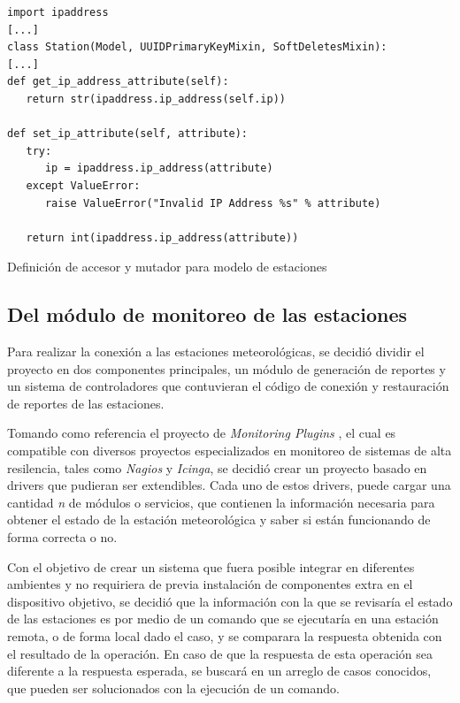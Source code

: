 
\begin{listing}
\begin{verbatim}
import ipaddress
[...]
class Station(Model, UUIDPrimaryKeyMixin, SoftDeletesMixin):
[...]
def get_ip_address_attribute(self):
   return str(ipaddress.ip_address(self.ip))

def set_ip_attribute(self, attribute):
   try:
      ip = ipaddress.ip_address(attribute)
   except ValueError:
      raise ValueError("Invalid IP Address %s" % attribute)

   return int(ipaddress.ip_address(attribute))
\end{verbatim}
\caption{Definición de accesor y mutador para modelo de estaciones}
\label{lst:model-station-mutator}
\end{listing}

\subsection{Del módulo de monitoreo de las estaciones}

Para realizar la conexión a las estaciones meteorológicas, se decidió dividir el proyecto en dos componentes principales, un módulo de generación de reportes y un sistema de controladores que contuvieran el código de conexión y restauración de reportes de las estaciones.

Tomando como referencia el proyecto de \textit{Monitoring Plugins} \cite{monitoring_plugins}, el cual es compatible con diversos proyectos especializados en monitoreo de sistemas de alta resilencia, tales como \textit{Nagios} y \textit{Icinga}, se decidió crear un proyecto basado en drivers que pudieran ser extendibles. Cada uno de estos drivers, puede cargar una cantidad \textit{n} de módulos o servicios, que contienen la información necesaria para obtener el estado de la estación meteorológica y saber si están funcionando de forma correcta o no.

Con el objetivo de crear un sistema que fuera posible integrar en diferentes ambientes y no requiriera de previa instalación de componentes extra en el dispositivo objetivo, se decidió que la información con la que se revisaría el estado de las estaciones es por medio de un comando que se ejecutaría en una estación remota, o de forma local dado el caso, y se comparara la respuesta obtenida con el resultado de la operación. En caso de que la respuesta de esta operación sea diferente a la respuesta esperada, se buscará en un arreglo de casos conocidos, que pueden ser solucionados con la ejecución de un comando.


